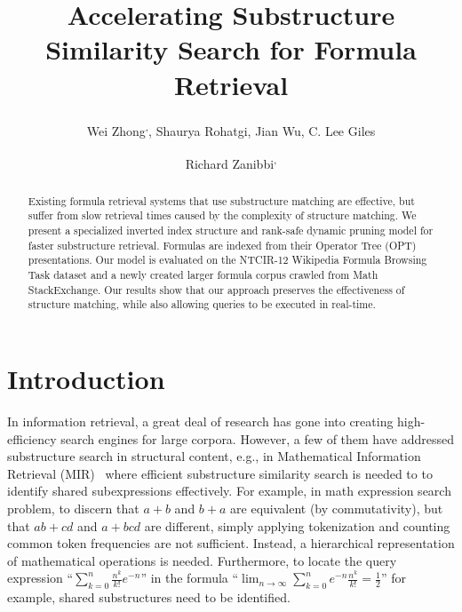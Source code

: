 \documentclass[runningheads]{llncs}
\begin{document}
%
\title{Accelerating Substructure Similarity Search for Formula Retrieval}

\author{Wei Zhong\textsuperscript{,\Letter}, Shaurya Rohatgi, Jian Wu, C. Lee Giles \and Richard Zanibbi\textsuperscript{,\Letter}}


\maketitle

\begin{abstract}
Existing formula retrieval systems that use substructure matching are effective, but suffer from slow retrieval times caused by the complexity of structure matching.  We present a specialized inverted index structure and rank-safe dynamic pruning model for faster substructure retrieval. Formulas are indexed from their Operator Tree (OPT) presentations. Our model is evaluated on the NTCIR-12 Wikipedia Formula Browsing Task dataset and a newly created larger formula corpus crawled from Math StackExchange.  Our results show that
our approach preserves the effectiveness of structure matching, while also allowing queries to be executed in real-time.

\end{abstract}

\section{Introduction}
In information retrieval, a great deal of research has gone into creating high-efficiency search engines for large corpora.
However, a few of them have addressed substructure search in structural content, e.g., in Mathematical Information Retrieval (MIR)~\cite{survey2012} where efficient substructure similarity search is needed to to identify shared subexpressions effectively.
%
%
For example, in math expression search problem, to discern that $a+b$ and $b + a$ are equivalent (by commutativity), but that $ab+cd$ and $a+bcd$ are different, simply applying tokenization and counting common token frequencies are not sufficient. Instead, a hierarchical representation of mathematical operations is needed.
Furthermore, to locate the query expression ``$\sum^{n}_{k=0} \frac{n^k}{k!} e^{-n}$'' in the formula ``$\lim_{n \rightarrow \infty} \sum^{n}_{k=0} e^{-n} \frac{n^k}{k!} = \frac 12$'' for example, shared substructures need to be identified.
\end{document}
